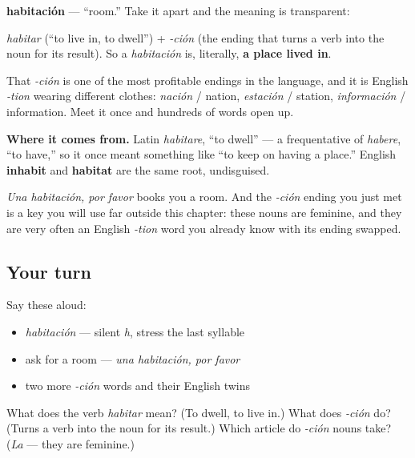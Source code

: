 \begin{cousinweb}
\textbf{habitación} — \textquotedblleft{}room.\textquotedblright{} Take it apart and the meaning is transparent:

\emph{habitar} (\textquotedblleft{}to live in, to dwell\textquotedblright{}) + \emph{-ción} (the ending that turns a verb into the noun for its result). So a \emph{habitación} is, literally, \textbf{a place lived in}.

That \emph{-ción} is one of the most profitable endings in the language, and it is English \emph{-tion} wearing different clothes: \emph{nación} / nation, \emph{estación} / station, \emph{información} / information. Meet it once and hundreds of words open up.

\textbf{Where it comes from.} Latin \emph{habitare}, \textquotedblleft{}to dwell\textquotedblright{} — a frequentative of \emph{habere}, \textquotedblleft{}to have,\textquotedblright{} so it once meant something like \textquotedblleft{}to keep on having a place.\textquotedblright{} English \textbf{inhabit} and \textbf{habitat} are the same root, undisguised.
\end{cousinweb}

\begin{grammarlens}[title={What you've built}]
\emph{Una habitación, por favor} books you a room. And the \emph{-ción} ending you just met is a key you will use far outside this chapter: these nouns are feminine, and they are very often an English \emph{-tion} word you already know with its ending swapped.
\end{grammarlens}

\subsection*{Your turn}
Say these aloud:

\begin{itemize}
\raggedright
  \item \emph{habitación} — silent \emph{h}, stress the last syllable
  \item ask for a room — \emph{una habitación, por favor}
  \item two more \emph{-ción} words and their English twins
\end{itemize}

\begin{tcolorbox}[breakable,colback=teal!4,colframe=teal!35!black,title={Before you move on}]
What does the verb \emph{habitar} mean? (To dwell, to live in.) What does \emph{-ción} do? (Turns a verb into the noun for its result.) Which article do \emph{-ción} nouns take? (\emph{La} — they are feminine.)
\end{tcolorbox}
